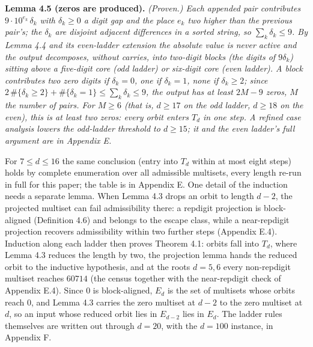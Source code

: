 \documentclass[11pt,letterpaper]{article}
\theoremstyle{paperstyle}
\theoremstyle{paperstyledef}
\theoremstyle{paperstylerem}
\begin{document}
\textbf{Lemma 4.5 (zeros are produced).} \emph{(Proven.) Each appended pair contributes \(9 \cdot 10^{e_k}\, \delta_k\) with \(\delta_k \geq 0\) a digit gap and the place \(e_k\) two higher than the previous pair's; the \(\delta_k\) are disjoint adjacent differences in a sorted string, so \(\sum_k \delta_k \leq 9\). By Lemma 4.4 and its even-ladder extension the absolute value is never active and the output decomposes, without carries, into two-digit blocks (the digits of \(9\delta_k\)) sitting above a five-digit core (odd ladder) or six-digit core (even ladder). A block contributes two zero digits if \(\delta_k = 0\), one if \(\delta_k = 1\), none if \(\delta_k \geq 2\); since \(2\,\#\{\delta_k \geq 2\} + \#\{\delta_k = 1\} \leq \sum_k \delta_k \leq 9\), the output has at least \(2M - 9\) zeros, \(M\) the number of pairs. For \(M \geq 6\) (that is, \(d \geq 17\) on the odd ladder, \(d \geq 18\) on the even), this is at least two zeros: every orbit enters \(T_d\) in one step. A refined case analysis lowers the odd-ladder threshold to \(d \geq 15\); it and the even ladder's full argument are in Appendix E.}

For \(7 \leq d \leq 16\) the same conclusion (entry into \(T_d\) within at most eight steps) holds by complete enumeration over all admissible multisets, every length re-run in full for this paper; the table is in Appendix E. One detail of the induction needs a separate lemma. When Lemma 4.3 drops an orbit to length \(d - 2\), the projected multiset can fail admissibility there: a repdigit projection is block-aligned (Definition 4.6) and belongs to the escape class, while a near-repdigit projection recovers admissibility within two further steps (Appendix E.4). Induction along each ladder then proves Theorem 4.1: orbits fall into \(T_d\), where Lemma 4.3 reduces the length by two, the projection lemma hands the reduced orbit to the inductive hypothesis, and at the roots \(d = 5, 6\) every non-repdigit multiset reaches \(60714\) (the census together with the near-repdigit check of Appendix E.4). Since \(0\) is block-aligned, \(E_d\) is the set of multisets whose orbits reach \(0\), and Lemma 4.3 carries the zero multiset at \(d - 2\) to the zero multiset at \(d\), so an input whose reduced orbit lies in \(E_{d-2}\) lies in \(E_d\). The ladder rules themselves are written out through \(d = 20\), with the \(d = 100\) instance, in Appendix F.
\end{document}
